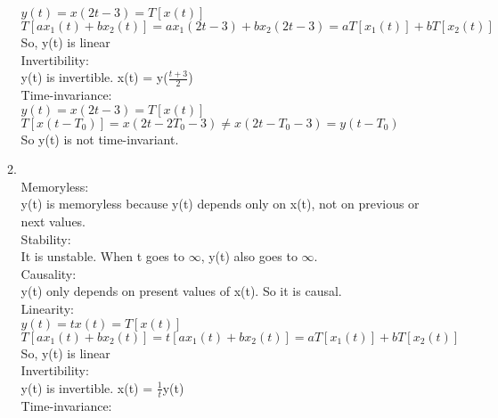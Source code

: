 \documentclass[10pt,a4paper, margin=1in]{article}
\begin{document}
\begin{enumerate}
\begin{enumerate}
     $y(t) = x(2t-3) = T[x(t)]$\\
     $T[ax_1(t) + bx_2(t)] = ax_1(2t-3) + bx_2(2t-3) = aT[x_1(t)] + bT[x_2(t)]$\\
     So, y(t) is linear\\
     
     Invertibility:\\
     
     y(t) is invertible. x(t) = y($\frac{t+3}{2}$)\\
     
     Time-invariance:\\
     
     $y(t) = x(2t-3) = T[x(t)]$\\
     $T[x(t-T_0)] = x(2t-2T_0 - 3) \ne x(2t- T_0 -3) = y(t- T_0)$\\
     So y(t) is not time-invariant. \\
     
     
    \item %
    \ \\
    Memoryless:\\
    
    y(t) is memoryless because y(t) depends only on x(t), not on previous or next values.\\
    
    Stability: \\
    
   It is unstable. When t goes to $\infty$, y(t) also goes to $\infty$. \\
  
    
    Causality:\\
    
    	y(t) only depends on present values of x(t). So it is causal.\\
    	
    Linearity:\\
    
    $y(t) = tx(t) = T[x(t)]$\\
    $T[ax_1(t) + bx_2(t)] =t[ax_1(t) + bx_2(t)] = aT[x_1(t)] + bT[x_2(t)]$\\
    So, y(t) is linear\\
    
    Invertibility:\\
    
    y(t) is invertible. x(t) = $\frac{1}{t}$y(t)\\
    
    Time-invariance:\\
    

\end{enumerate}
\end{enumerate}
\end{document}
